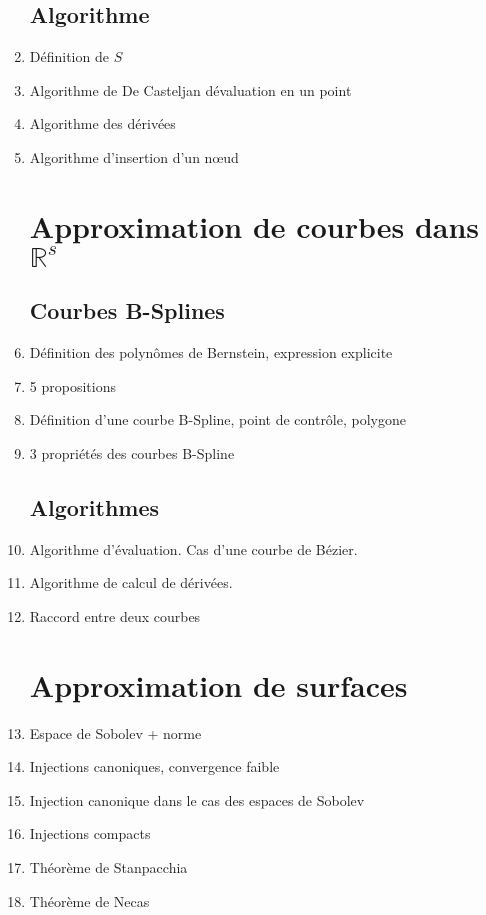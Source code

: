\documentclass{article}
\begin{document}
\begin{enumerate}
\subsection{Algorithme}
\item Définition de $S$
\item Algorithme de De Casteljan dévaluation en un point
\item Algorithme des dérivées
\item Algorithme d'insertion d'un n\oe ud
\section{Approximation de courbes dans $\mathbb{R}^s$}
\subsection{Courbes B-Splines}
\item Définition des polynômes de Bernstein, expression explicite
\item 5 propositions
\item Définition d'une courbe B-Spline, point de contrôle, polygone
\item 3 propriétés des courbes B-Spline
\subsection{Algorithmes}
\item Algorithme d'évaluation. Cas d'une courbe de Bézier.
\item Algorithme de calcul de dérivées. 
\item Raccord entre deux courbes
\section{Approximation de surfaces}
\item Espace de Sobolev + norme
\item Injections canoniques, convergence faible
\item Injection canonique dans le cas des espaces de Sobolev
\item Injections compacts
\item Théorème de Stanpacchia
\item Théorème de Necas
\end{enumerate}
\end{document}
